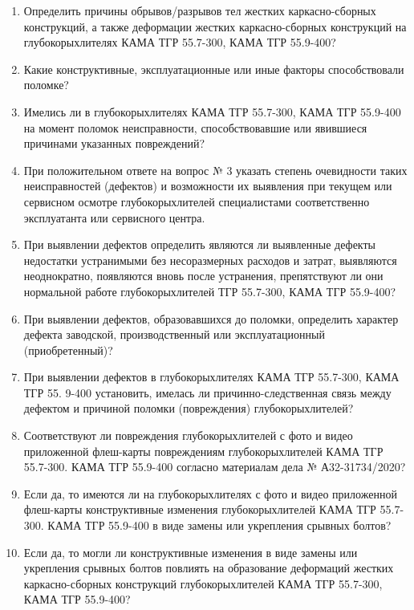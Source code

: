 \begin{enumerate}
	
\item  Определить причины обрывов/разрывов тел жестких каркасно-сборных конструкций, а также деформации жестких каркасно-сборных конструкций на глубокорыхлителях КАМА ТГР 55.7-300, КАМА ТГР 55.9-400?
\item 	Какие конструктивные, эксплуатационные или иные факторы способствовали поломке?
\item 	Имелись ли в глубокорыхлителях КАМА ТГР 55.7-300, КАМА ТГР 55.9-400 на момент поломок неисправности, способствовавшие или явившиеся причинами указанных повреждений?
\item 	При положительном ответе на вопрос № 3 указать степень очевидности таких неисправностей (дефектов) и возможности их выявления при текущем или сервисном осмотре глубокорыхлителей специалистами соответственно эксплуатанта или сервисного центра.
\item 	При выявлении дефектов  определить являются ли выявленные дефекты недостатки устранимыми без несоразмерных расходов и затрат, выявляются неоднократно, появляются вновь после устранения, препятствуют ли они нормальной работе глубокорыхлителей ТГР 55.7-300, КАМА ТГР 55.9-400?
\item 	При выявлении дефектов, образовавшихся до поломки, определить характер дефекта заводской, производственный или эксплуатационный (приобретенный)?
\item 	При выявлении дефектов в глубокорыхлителях КАМА ТГР 55.7-300, КАМА ТГР 55. 9-400  установить, имелась ли причинно-следственная связь между дефектом и причиной поломки (повреждения) глубокорыхлителей?
\item 	Соответствуют ли повреждения глубокорыхлителей с фото и видео приложенной флеш-карты повреждениям глубокорыхлителей КАМА ТГР 55.7-300. КАМА ТГР 55.9-400 согласно материалам дела № А32-31734/2020?
\item 	Если да, то имеются ли на глубокорыхлителях с фото и видео приложенной флеш-карты конструктивные изменения глубокорыхлителей КАМА ТГР 55.7-300. КАМА ТГР 55.9-400 в виде замены или укрепления срывных болтов?
\item 	Если да, то	могли ли конструктивные изменения в виде замены или укрепления срывных болтов повлиять на образование деформаций жестких каркасно-сборных конструкций глубокорыхлителей КАМА ТГР 55.7-300, КАМА ТГР 55.9-400?
\end{enumerate}


\vspace{10mm}

